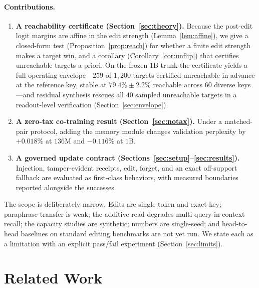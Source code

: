 \documentclass[11pt]{article}
\theoremstyle{remark}
\begin{document}
\paragraph{Contributions.}
\begin{enumerate}
  \item \textbf{A reachability certificate (Section~\ref{sec:theory}).} Because
  the post-edit logit margins are affine in the edit strength
  (Lemma~\ref{lem:affine}), we give a closed-form test
  (Proposition~\ref{prop:reach}) for whether a finite edit strength makes a
  target win, and a corollary (Corollary~\ref{cor:unflip}) that certifies
  unreachable targets a priori. On the frozen $1$B trunk the certificate yields
  a full operating envelope---$259$ of $1{,}200$ targets certified unreachable in
  advance at the reference key, stable at $79.4\%\pm2.2\%$ reachable across $60$
  diverse keys---and residual synthesis rescues all $40$ sampled unreachable
  targets in a readout-level verification (Section~\ref{sec:envelope}).
  \item \textbf{A zero-tax co-training result (Section~\ref{sec:notax}).} Under a
  matched-pair protocol, adding the memory module changes validation perplexity by
  $+0.018\%$ at $136$M and $-0.116\%$ at $1$B.
  \item \textbf{A governed update contract (Sections~\ref{sec:setup}--\ref{sec:results}).}
  Injection, tamper-evident receipts, edit, forget, and an exact off-support
  fallback are evaluated as first-class behaviors, with measured boundaries
  reported alongside the successes.
\end{enumerate}

The scope is deliberately narrow. Edits are single-token and
exact-key; paraphrase transfer is weak; the additive read degrades multi-query
in-context recall; the capacity studies are synthetic; numbers are single-seed;
and head-to-head baselines on standard editing benchmarks are not yet run. We
state each as a limitation with an explicit pass/fail experiment
(Section~\ref{sec:limits}).

\section{Related Work}
\label{sec:related}
\end{document}
